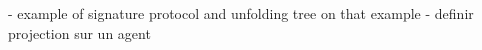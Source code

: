 - example of signature protocol and unfolding tree on that example
- definir projection sur un agent
